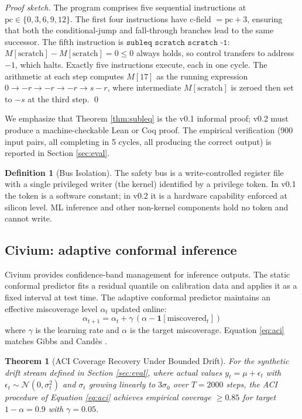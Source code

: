 \documentclass[conference]{IEEEtran}
\theoremstyle{definition}
\newtheorem{definition}{Definition}
\theoremstyle{plain}
\newtheorem{theorem}{Theorem}
\theoremstyle{remark}
\begin{document}
\begin{proof}[Proof sketch]
The program comprises five sequential instructions at $\text{pc} \in \{0, 3, 6, 9, 12\}$. The first four instructions have c-field $= \text{pc} + 3$, ensuring that both the conditional-jump and fall-through branches lead to the same successor. The fifth instruction is $\texttt{subleq scratch scratch -1}$: $M[\text{scratch}] - M[\text{scratch}] = 0 \leq 0$ always holds, so control transfers to address $-1$, which halts. Exactly five instructions execute, each in one cycle. The arithmetic at each step computes $M[17]$ as the running expression $0 \to -r \to -r \to -r \to s - r$, where intermediate $M[\text{scratch}]$ is zeroed then set to $-s$ at the third step. \qed
\end{proof}

We emphasize that Theorem \ref{thm:subleq} is the v0.1 informal proof; v0.2 must produce a machine-checkable Lean or Coq proof. The empirical verification (900 input pairs, all completing in 5 cycles, all producing the correct output) is reported in Section \ref{sec:eval}.

\begin{definition}[Bus Isolation]
The safety bus is a write-controlled register file with a single privileged writer (the kernel) identified by a privilege token. In v0.1 the token is a software constant; in v0.2 it is a hardware capability enforced at silicon level. ML inference and other non-kernel components hold no token and cannot write.
\end{definition}

\subsection{Civium: adaptive conformal inference}

Civium provides confidence-band management for inference outputs. The static conformal predictor fits a residual quantile on calibration data and applies it as a fixed interval at test time. The adaptive conformal predictor maintains an effective miscoverage level $\alpha_t$ updated online:
\begin{equation}
\alpha_{t+1} = \alpha_t + \gamma\,(\alpha - \mathbf{1}[\text{miscovered}_t])
\label{eq:aci}
\end{equation}
where $\gamma$ is the learning rate and $\alpha$ is the target miscoverage. Equation \eqref{eq:aci} matches Gibbs and Cand{\`e}s \cite{gibbs_aci_2021}.

\begin{theorem}[ACI Coverage Recovery Under Bounded Drift]
\label{thm:aci}
For the synthetic drift stream defined in Section \ref{sec:eval}, where actual values $y_t = \mu + \epsilon_t$ with $\epsilon_t \sim \mathcal{N}(0, \sigma_t^2)$ and $\sigma_t$ growing linearly to $3\sigma_0$ over $T = 2000$ steps, the ACI procedure of Equation \eqref{eq:aci} achieves empirical coverage $\geq 0.85$ for target $1 - \alpha = 0.9$ with $\gamma = 0.05$.
\end{theorem}
\end{document}
